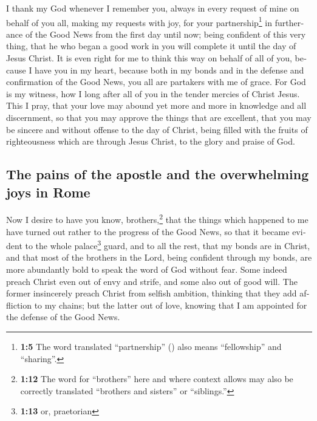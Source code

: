 \begin{paracol}{2}
\begin{otherlanguage}{english}
 I thank my God whenever I remember you, 
always in every request of mine on behalf of you all, making my requests
with joy,  for your partnership\footnote{\textbf{1:5} The
  word translated ``partnership'' () also means
  ``fellowship'' and ``sharing''.} in furtherance of the Good News from
the first day until now;  being confident of this very
thing, that he who began a good work in you will complete it until the
day of Jesus Christ.  It is even right for me to think
this way on behalf of all of you, because I have you in my heart,
because both in my bonds and in the defense and confirmation of the Good
News, you all are partakers with me of grace.  For God is
my witness, how I long after all of you in the tender mercies of Christ
Jesus.  This I pray, that your love may abound yet more
and more in knowledge and all discernment,  so that you
may approve the things that are excellent, that you may be sincere and
without offense to the day of Christ,  being filled with
the fruits of righteousness which are through Jesus Christ, to the glory
and praise of God.

\hypertarget{the-pains-of-the-apostle-and-the-overwhelming-joys-in-rome}{%
\subsection{The pains of the apostle and the overwhelming joys in
Rome}\label{the-pains-of-the-apostle-and-the-overwhelming-joys-in-rome}}

 Now I desire to have you know, brothers,\footnote{\textbf{1:12}
  The word for ``brothers'' here and where context allows may also be
  correctly translated ``brothers and sisters'' or ``siblings.''} that
the things which happened to me have turned out rather to the progress
of the Good News,  so that it became evident to the whole
palace\footnote{\textbf{1:13} or, praetorian} guard, and to all the
rest, that my bonds are in Christ,  and that most of the
brothers in the Lord, being confident through my bonds, are more
abundantly bold to speak the word of God without fear. 
Some indeed preach Christ even out of envy and strife, and some also out
of good will.  The former insincerely preach Christ from
selfish ambition, thinking that they add affliction to my chains;
 but the latter out of love, knowing that I am appointed
for the defense of the Good News.


\end{otherlanguage}
\end{paracol}
